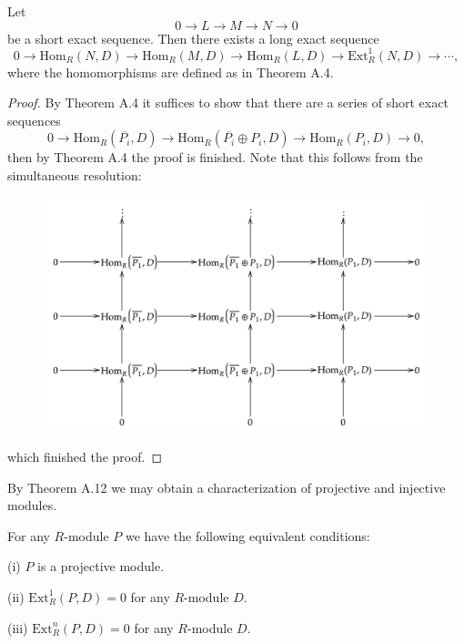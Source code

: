\begin{theorem}
Let 
$$
0\longrightarrow L\longrightarrow M\longrightarrow N\longrightarrow 0
$$
be a short exact sequence. Then there exists a long exact sequence 
$$
0\longrightarrow \mathrm{Hom}_R\left( N,D \right) \longrightarrow \mathrm{Hom}_R\left( M,D \right) \longrightarrow \mathrm{Hom}_R\left( L,D \right) \longrightarrow \mathrm{Ext}_{R}^{1}\left( N,D \right) \longrightarrow \cdots ,
$$
where the homomorphisms are defined as in Theorem A.4.
\end{theorem}
\begin{proof}
By Theorem A.4 it suffices to show that there are a series of short exact sequences 
$$
0\longrightarrow \mathrm{Hom}_R\left( \overline{P_i},D \right) \longrightarrow \mathrm{Hom}_R\left( \overline{P_i}\oplus P_i,D \right) \longrightarrow \mathrm{Hom}_R\left( P_i,D \right) \longrightarrow 0,
$$
then by Theorem A.4 the proof is finished. Note that this follows from the simultaneous resolution: \par
\begin{figure}[htbp]
    \center
    \includegraphics[scale=0.24]{Images/diagram-20240314 (4).png}
\end{figure}
which finished the proof.
\end{proof}
By Theorem A.12 we may obtain a characterization of projective and injective modules.
\begin{theorem}
For any $R$-module $P$ we have the following equivalent conditions: \par
(i) $P$ is a projective module.\par
(ii) $\mathrm{Ext}_R^1(P,D)=0$ for any $R$-module $D$.\par
(iii) $\mathrm{Ext}_R^n(P,D)=0$ for any $R$-module $D$.
\end{theorem}
